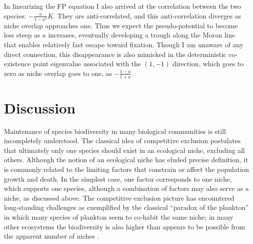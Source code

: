 In linearizing the FP equation I also arrived at the correlation between the two species: $-\frac{a}{1-a^2}K$. 
They are anti-correlated, and this anti-correlation diverges as niche overlap approaches one. 
Thus we expect the pseudo-potential to become less steep as $a$ increases, eventually developing a trough along the Moran line that enables relatively fast escape toward fixation. 
Though I am unaware of any direct connection, this disappearance is also mimicked in the deterministic co-existence point eigenvalue associated with the $(1,-1)$ direction, which goes to zero as niche overlap goes to one, as $-\frac{1-a}{1+a}$. %


\section{Discussion}
Maintenance of species biodiversity in many biological communities is still incompletely understood. 
The classical idea of competitive exclusion postulates that ultimately only one species should exist in an ecological niche, excluding all others. 
Although the notion of an ecological niche has eluded precise definition, it is commonly related to the limiting factors that constrain or affect the population growth and death. 
In the simplest case, one factor corresponds to one niche, which supports one species, although a combination of factors may also serve as a niche, as discussed above. 
The competitive exclusion picture has encountered long-standing challenges as exemplified by the classical ``paradox of the plankton'' \cite{Hutchinson1961,Chesson2000} in which many species of plankton seem to co-habit the same niche; in many other ecosystems the biodiversity is also higher than appears to be possible from the apparent number of niches \cite{MacArthur1957,Shmida1984,May1999,Chesson2000,Hubbell2001}.

